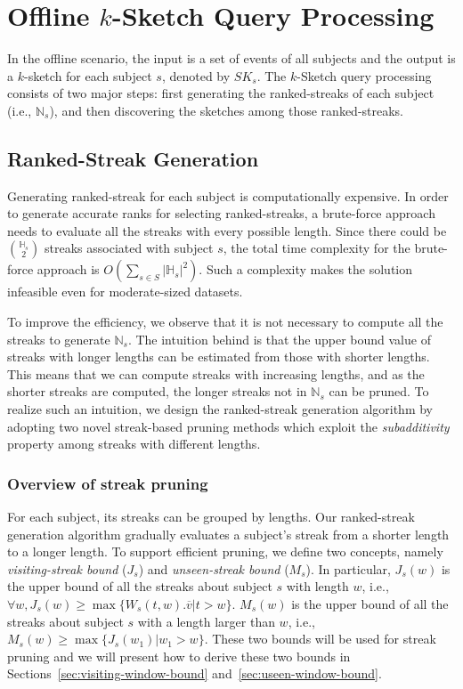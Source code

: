 \section {Offline $k$-Sketch Query Processing}\label{sec:offline}
In the offline scenario, the input is a set of events
of all subjects and the output is a $k$-sketch 
for each subject $s$, denoted by $SK_s$. 
The $k$-Sketch query processing consists of two 
major steps: first generating the ranked-streaks of each subject (i.e., $\mathbb{N}_s$), 
and then discovering the sketches among those ranked-streaks. 

\subsection{Ranked-Streak Generation}
Generating ranked-streak for each subject is computationally 
expensive. %
In order to generate accurate ranks for selecting ranked-streaks, 
a brute-force approach needs to evaluate all the streaks with every possible 
length. %
Since there could be $\mathbb{H}_s \choose 2$ streaks
associated with subject $s$, 
the total time complexity for the brute-force approach
is $O(\sum_{s \in S}|\mathbb{H}_s|^2)$. Such a complexity makes the 
solution infeasible even for moderate-sized datasets.

To improve the efficiency, 
we observe that it is not necessary to 
compute all the streaks to generate $\mathbb{N}_s$.
The intuition behind is that the upper bound value of streaks with longer lengths can be estimated from those
with shorter lengths. This means that we can compute streaks 
with increasing lengths, and as the shorter streaks are computed, 
the longer streaks not in $\mathbb{N}_s$ can be pruned.
To realize such an intuition, we design the ranked-streak generation algorithm
by adopting two novel streak-based pruning methods which 
exploit the \emph{subadditivity} property among streaks with different lengths.


\subsubsection{Overview of streak pruning}
For each subject, its streaks can be grouped by lengths. Our ranked-streak
generation algorithm gradually evaluates a subject's streak from a shorter
length to a longer length. To support efficient pruning, 
we define two concepts, namely \emph{visiting-streak bound} ($J_s$) and \emph{unseen-streak bound} ($M_s$).
In particular, $J_s(w)$ is the upper bound of all the streaks about subject $s$ with length $w$, i.e., $\forall w,J_s(w) \geq \max\{W_s(t,w).\overline{v} | t > w\}$. 
$M_s(w)$ is the upper bound of all the streaks about subject $s$ with a length larger than $w$, i.e., $M_s(w) \geq \max\{J_s(w_1) | w_1 > w\}$.  These two bounds will be used for streak pruning and we will present how to derive these two  bounds in Sections~\ref{sec:visiting-window-bound} and~\ref{sec:useen-window-bound}.

